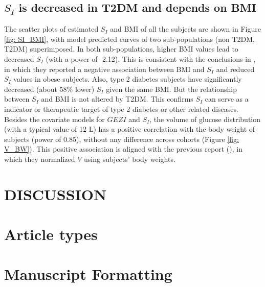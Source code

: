 \documentclass[utf8]{frontiersSCNS} %
\begin{document}
\subsection{$S_I$ is decreased in T2DM and depends on BMI}
The scatter plots of estimated $S_I$ and BMI of all the subjects are shown in Figure \ref{fig: SI_BMI}, with model predicted curves of two sub-populations (non T2DM, T2DM) superimposed. In both sub-populations, higher BMI values lead to decreased $S_I$ (with a power of -2.12). This is consistent with the conclusions in %
, in which they reported a negative association between BMI and $S_I$ and reduced $S_I$ values in obese subjects. Also, type 2 diabetes subjects have significantly decreased (about 58\% lower) $S_I$ given the same BMI. But the relationship between $S_I$ and BMI is not altered by T2DM. This confirms $S_I$ can serve as a indicator or therapeutic target of type 2 diabetes or other related diseases. Besides the covariate models for $GEZI$ and $S_I$, the volume of glucose distribution (with a typical value of 12 L) has a positive correlation with the body weight of subjects (power of 0.85), without any difference across cohorts (Figure \ref{fig: V_BW}). This positive association is aligned with the previous report (\cite{Denti2010}), in which they normalized $V$ using subjects' body weights. 
\\

\section{DISCUSSION}

\section*{Article types}



\section{Manuscript Formatting}
\end{document}
